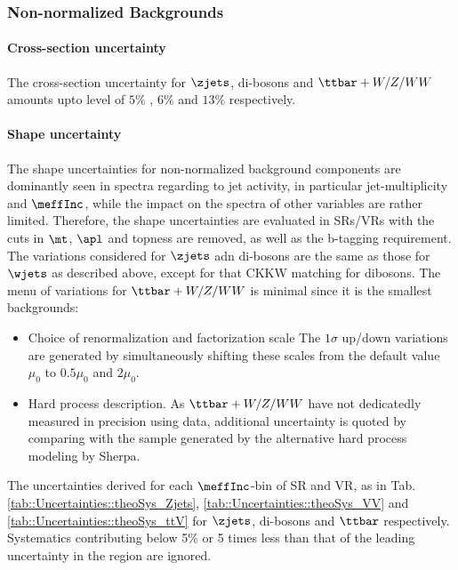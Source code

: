 



\clearpage
\subsubsection{Non-normalized Backgrounds}  
\paragraph{Cross-section uncertainty}
The cross-section uncertainty for $\zjets$, di-bosons and $\ttbar+W/Z/WW$ amounts upto level of $5\%$ \cite{VjetsXsecMeas_ATLAS_Run1}, $6\%$ \cite{BosonXsec_calc_ATLAS} and $13\%$ \cite{Alwall:2014hca} respectively. 

\paragraph{Shape uncertainty}
The shape uncertainties for non-normalized background components are dominantly seen in spectra regarding to jet activity, in particular jet-multiplicity and $\meffInc$, while the impact on the spectra of other variables are rather limited. Therefore, the shape uncertainties are evaluated in SRs/VRs with the cuts in $\mt$, $\apl$ and topness are removed, as well as the b-tagging requirement. \\


The variations considered for $\zjets$ adn di-bosons are the same as those for $\wjets$ as described above, except for that CKKW matching for dibosons. The menu of variations for $\ttbar+W/Z/WW$ is minimal since it is the smallest backgrounds:
\begin{itemize}
\item Choice of renormalization and factorization scale
The $1\sigma$ up/down variations are generated by simultaneously shifting these scales from the default value $\mu_0$ to $0.5\mu_0$ and $2\mu_0$.
\item Hard process description.
As $\ttbar+W/Z/WW$ have not dedicatedly measured in precision using data, additional uncertainty is quoted by comparing with the sample generated by the alternative hard process modeling by Sherpa.
\end{itemize}

The uncertainties derived for each $\meffInc$-bin of SR and VR, as in Tab. \ref{tab::Uncertainties::theoSys_Zjets}, \ref{tab::Uncertainties::theoSys_VV} and \ref{tab::Uncertainties::theoSys_ttV} for $\zjets$, di-bosons and $\ttbar$ respectively. Systematics contributing below 5$\%$ or 5 times less than that of the leading uncertainty in the region are ignored.  \\

